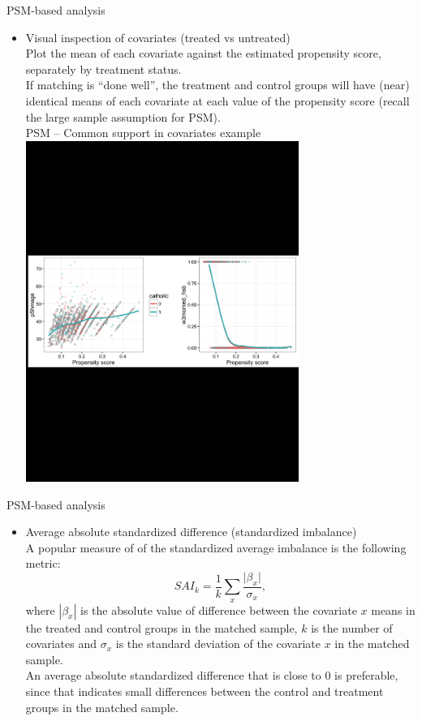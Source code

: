 \documentclass{beamer}
\begin{document}
\begin{frame}{PSM-based analysis}
\begin{itemize}
    \item Visual inspection of covariates (treated vs untreated)\\
    \medskip
    Plot the mean of each covariate against the estimated propensity score, separately by treatment status. \\ \medskip If matching is ``done well'', the treatment and control groups will have (near) identical means of each covariate at each value of the propensity score (recall the large sample assumption for PSM).\\ \medskip
    \centering
    PSM -- Common support in covariates example \\ \medskip
\includegraphics[trim = 0.4cm 23cm 0cm 23cm, clip, width=0.7\textwidth]{./IMG/PSM_vis_insp.jpg} 
\end{itemize}
\end{frame}
\begin{frame}{PSM-based analysis}
\begin{itemize}
    \item Average absolute standardized difference (standardized imbalance) \\ \medskip
    A popular measure of of the standardized average imbalance is the following metric: \\ \medskip
    $$
    \textit{SAI}_k = 
    \frac{1}{k} \sum_x \frac{\vert \beta_x \vert }{\sigma_x},
    $$
    where $| \beta_x |$ is the absolute value of difference between the covariate $x$ means in the treated and control groups in the matched sample, $k$ is the number of covariates and $\sigma_x$ is the standard deviation of the covariate $x$ in the matched sample. \\ \medskip An average absolute standardized difference that is close to 0 is preferable, since that indicates small differences between the control and treatment groups in the matched sample.
\end{itemize}
\end{frame}
\end{document}
